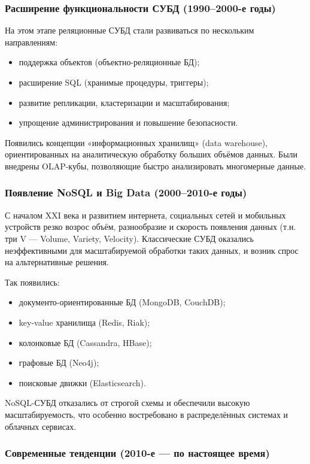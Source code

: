 \subsubsection{Расширение функциональности СУБД (1990–2000-е годы)}

На этом этапе реляционные СУБД стали развиваться по нескольким направлениям:
\begin{itemize}
	\item поддержка объектов (объектно-реляционные БД);
	\item расширение SQL (хранимые процедуры, триггеры);
	\item развитие репликации, кластеризации и масштабирования;
	\item упрощение администрирования и повышение безопасности.
\end{itemize}

Появились концепции «информационных хранилищ» (data warehouse), ориентированных на аналитическую обработку больших объёмов данных. Были внедрены OLAP-кубы, позволяющие быстро анализировать многомерные данные.

\subsubsection{Появление NoSQL и Big Data (2000–2010-е годы)}

С началом XXI века и развитием интернета, социальных сетей и мобильных устройств резко возрос объём, разнообразие и скорость появления данных (т.н. три V — Volume, Variety, Velocity). Классические СУБД оказались неэффективными для масштабируемой обработки таких данных, и возник спрос на альтернативные решения.

Так появились:
\begin{itemize}
	\item документо-ориентированные БД (MongoDB, CouchDB);
	\item key-value хранилища (Redis, Riak);
	\item колонковые БД (Cassandra, HBase);
	\item графовые БД (Neo4j);
	\item поисковые движки (Elasticsearch).
\end{itemize}

NoSQL-СУБД отказались от строгой схемы и обеспечили высокую масштабируемость, что особенно востребовано в распределённых системах и облачных сервисах.

\subsubsection{Современные тенденции (2010-е — по настоящее время)}

